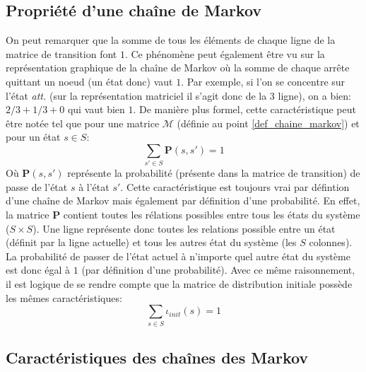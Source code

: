 \documentclass[letterpaper]{article}
\begin{document}
  \subsection{Propriété d'une chaîne de Markov}
    On peut remarquer que la somme de tous les éléments de chaque ligne de la
    matrice de transition font $1$.  Ce phénomène peut également être vu
    sur la représentation graphique de la chaîne de Markov où la somme de chaque
    arrête quittant un noeud (un état donc) vaut $1$.  Par exemple, si l'on se
    concentre sur l'état \textit{att.} (sur la représentation matriciel il s'agit donc 
    de la 3 ligne), on a bien: $2/3 + 1/3 + 0$ qui vaut bien $1$.  De manière 
    plus formel, cette caractéristique peut être notée tel que pour une matrice
    $\mathcal{M}$ (définie au point \ref{def_chaine_markov}) et pour un état $s \in S$:
    $$\sum\limits_{s' \in S} \mathbf{P}(s, s') = 1$$
    Où $\mathbf{P}(s, s')$ représente la probabilité (présente dans la matrice de
    transition) de passe de l'état $s$ à l'état $s'$.  Cette caractéristique est
    toujours vrai par défintion d'une chaîne de Markov mais également par définition
    d'une probabilité.
    En effet, la matrice $\mathbf{P}$ contient toutes les rélations possibles entre
    tous les états du système ($S \times S$).  Une ligne représente donc toutes les 
    relations possible entre un état (définit par la ligne actuelle) et tous les autres
    état du système (les $S$ colonnes).  La probabilité de passer de l'état actuel
    à n'importe quel autre état du système est donc égal à $1$ (par définition d'une probabilité).
    Avec ce même raisonnement, il est logique de se rendre compte que la matrice
    de distribution initiale possède les mêmes caractéristiques:
    $$\sum\limits_{s \in S} \iota_{init}(s) = 1$$
    
  \subsection{Caractéristiques des chaînes des Markov}
\end{document}
